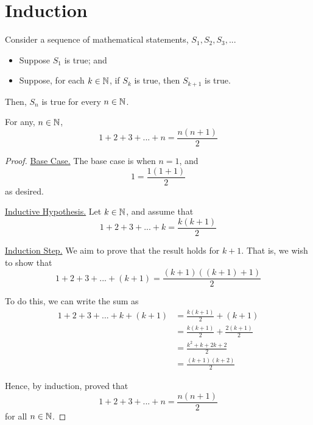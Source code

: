\chapter{Induction}

\begin{principle}[Induction]
	Consider a sequence of mathematical statements, $S_1, S_2, S_3, ...$
	\begin{itemize}
		\item Suppose $S_1$ is true; and
		\item Suppose, for each $k \in \mathbb{N}$, if $S_k$ is true, then $S_{k+1}$ is true.
	\end{itemize}

	Then, $S_n$ is true for every $n \in \mathbb{N}$.
\end{principle}

\begin{proposition}\label{triangular}
	For any, $n \in \mathbb{N}$,
	$$1 + 2 + 3 + ... + n = \frac{n(n+1)}{2}$$
\end{proposition}
\begin{proof}
	\underline{Base Case.} The base case is when $n = 1$, and
	$$1 =  \frac{1(1+1)}{2}$$
	as desired.

	\underline{Inductive Hypothesis.} Let $k \in \mathbb{N}$, and assume that 
	$$1 + 2 + 3 + ... + k = \frac{k(k+1)}{2}$$

	\underline{Induction Step.} We aim to prove that the result holds for $k+1$. That is, we wish to show that
	$$1 + 2 + 3 + ... + (k+1) = \frac{(k+1)((k+1)+1)}{2}$$

	To do this, we can write the sum as
	\begin{align*}
		1 + 2 + 3 + ... + k + (k+1) &= \frac{k(k+1)}{2} + (k+1) \\
																&= \frac{k(k+1)}{2} + \frac{2(k+1)}{2} \\
																&= \frac{k^2 + k + 2k + 2}{2} \\
																&= \frac{(k+1)(k+2)}{2}
	\end{align*}
	
	Hence, by induction, proved that $$1+2+3+...+n = \frac{n(n+1)}{2}$$ for all $n \in \mathbb{N}$.
\end{proof}

